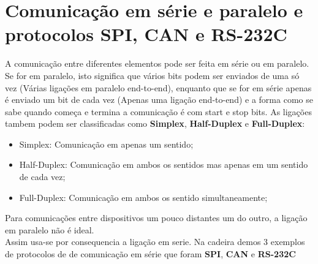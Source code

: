 \documentclass[a4paper, 11pt, onecolumn, oneside]{scrartcl}
\begin{document}
\section{Comunicação em série e paralelo e protocolos SPI, CAN e RS-232C}
A comunicação entre diferentes elementos pode ser feita em série ou em paralelo. Se for em paralelo, isto significa que vários 
bits podem ser enviados de uma só vez (Várias ligações em paralelo end-to-end), enquanto que se for em série apenas é enviado um bit de cada vez 
(Apenas uma ligação end-to-end) e a forma como se sabe quando começa e termina a comunicação é com start e stop bits.
\newline
As ligações tambem podem ser classificadas como \textbf{Simplex}, \textbf{Half-Duplex} e \textbf{Full-Duplex}:
\begin{itemize}
  \item Simplex: Comunicação em apenas um sentido;
  \item Half-Duplex: Comunicação em ambos os sentidos mas apenas em um sentido de cada vez;
  \item Full-Duplex: Comunicação em ambos os sentido simultaneamente;
\end{itemize}
Para comunicações entre dispositivos um pouco distantes um do outro, a ligação em paralelo não é ideal.\\
Assim usa-se por consequencia a ligação em serie. Na cadeira demos 3 exemplos de protocolos de de comunicação em série que foram \textbf{SPI}, \textbf{CAN} e \textbf{RS-232C}
\end{document}

